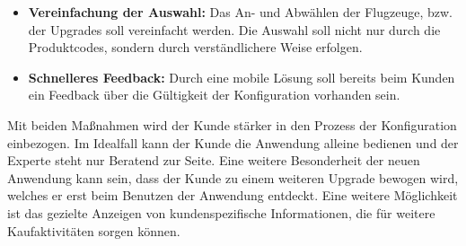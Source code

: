 \begin{itemize}
        \item \textbf{Vereinfachung der Auswahl:} Das An- und Abwählen der Flugzeuge, bzw. der Upgrades soll vereinfacht werden. Die Auswahl soll nicht nur durch die Produktcodes, sondern durch verständlichere Weise erfolgen. 
        \item \textbf{Schnelleres Feedback:} Durch eine mobile Lösung soll bereits beim Kunden ein Feedback über die Gültigkeit der Konfiguration vorhanden sein.
\end{itemize}

Mit beiden Maßnahmen wird der Kunde stärker in den Prozess der Konfiguration einbezogen. Im Idealfall kann der Kunde die Anwendung alleine bedienen und der Experte steht nur Beratend zur Seite. Eine weitere Besonderheit der neuen Anwendung kann sein, dass der Kunde zu einem weiteren Upgrade bewogen wird, welches er erst beim Benutzen der Anwendung entdeckt. Eine weitere Möglichkeit ist das gezielte Anzeigen von kundenspezifische Informationen, die für weitere Kaufaktivitäten sorgen können. \par

